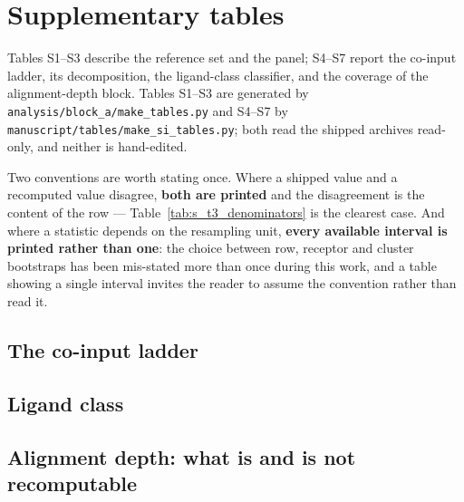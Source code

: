 \documentclass[11pt,a4paper]{article}
\begin{document}
\clearpage
\section{Supplementary tables}

Tables S1--S3 describe the reference set and the panel; S4--S7 report the co-input
ladder, its decomposition, the ligand-class classifier, and the coverage of the
alignment-depth block. Tables S1--S3 are generated by
\texttt{analysis/block\_a/make\_tables.py} and S4--S7 by
\texttt{manuscript/tables/make\_si\_tables.py}; both read the shipped archives
read-only, and neither is hand-edited.

Two conventions are worth stating once. Where a shipped value and a recomputed
value disagree, \textbf{both are printed} and the disagreement is the content of
the row --- Table~\ref{tab:s_t3_denominators} is the clearest case. And where a
statistic depends on the resampling unit, \textbf{every available interval is
printed rather than one}: the choice between row, receptor and cluster bootstraps
has been mis-stated more than once during this work, and a table showing a single
interval invites the reader to assume the convention rather than read it.





\clearpage
\subsection{The co-input ladder}




\clearpage
\subsection{Ligand class}



\clearpage
\subsection{Alignment depth: what is and is not recomputable}


\end{document}
